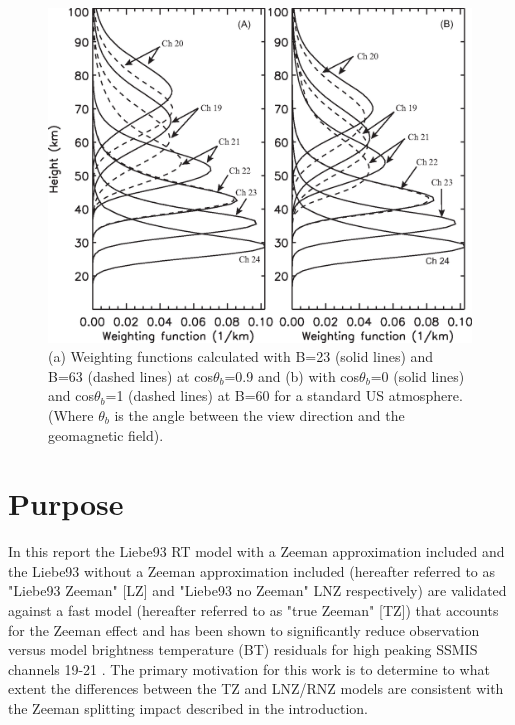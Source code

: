 \begin{figure}[htp]
  \centering{}
  \includegraphics[scale=0.8]{./graphics/Weight_Function.eps}
  \caption{(a) Weighting functions calculated with B=23\microtesla{} (solid lines) and B=63\microtesla{} (dashed lines) at cos$\theta_{b}$=0.9 and (b) with cos$\theta_{b}$=0 (solid lines) 
  and cos$\theta_{b}$=1 (dashed lines) at B=60\microtesla{} for a standard US atmosphere.
  (Where $\theta_{b}$ is the angle between the view direction and the geomagnetic field).}
  \label{fig:Weight_Function}
\end{figure}

\section{Purpose} 

In this report the Liebe93 RT model \cite{ref:Liebe1} with a Zeeman approximation included and the Liebe93 without a Zeeman approximation included 
(hereafter referred to as "Liebe93 Zeeman" [LZ] and "Liebe93 no Zeeman" LNZ respectively) \cite{ref:Liebe1} are validated
against a fast model (hereafter referred to as "true Zeeman" [TZ]) that accounts for the Zeeman effect and has been shown to significantly reduce observation versus model brightness
temperature (BT) residuals for high peaking SSMIS channels 19-21 \cite{ref:Han1}. 
The primary motivation for this work is to determine to what extent the differences between the TZ and LNZ/RNZ models are consistent
with the Zeeman splitting impact described in the introduction.  
    
